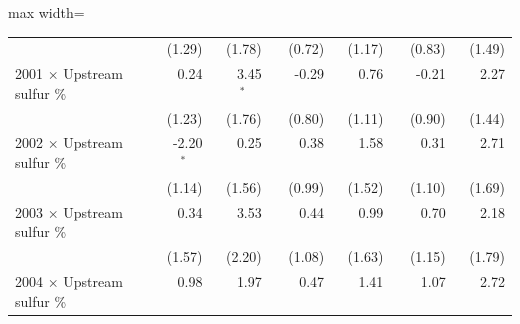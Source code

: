 \begin{table}[htbp]
{\begin{adjustbox}{max width=\linewidth}
\begin{tabular}{lrrrrrr}
 & (\phantom{-}1.29)\phantom{$^{***}$} & (\phantom{-}1.78)\phantom{$^{***}$} & (\phantom{-}0.72)\phantom{$^{***}$} & (\phantom{-}1.17)\phantom{$^{***}$} & (\phantom{-}0.83)\phantom{$^{***}$} & (\phantom{-}1.49)\phantom{$^{***}$} \\
2001 $\times$ Upstream sulfur \% & \phantom{(}\phantom{-}0.24$^{\phantom{*}\phantom{*}\phantom{*}}$ & \phantom{(}\phantom{-}3.45$^{*\phantom{*}\phantom{*}}$ & \phantom{(}-0.29$^{\phantom{*}\phantom{*}\phantom{*}}$ & \phantom{(}\phantom{-}0.76$^{\phantom{*}\phantom{*}\phantom{*}}$ & \phantom{(}-0.21$^{\phantom{*}\phantom{*}\phantom{*}}$ & \phantom{(}\phantom{-}2.27$^{\phantom{*}\phantom{*}\phantom{*}}$ \\
 & (\phantom{-}1.23)\phantom{$^{***}$} & (\phantom{-}1.76)\phantom{$^{***}$} & (\phantom{-}0.80)\phantom{$^{***}$} & (\phantom{-}1.11)\phantom{$^{***}$} & (\phantom{-}0.90)\phantom{$^{***}$} & (\phantom{-}1.44)\phantom{$^{***}$} \\
2002 $\times$ Upstream sulfur \% & \phantom{(}-2.20$^{*\phantom{*}\phantom{*}}$ & \phantom{(}\phantom{-}0.25$^{\phantom{*}\phantom{*}\phantom{*}}$ & \phantom{(}\phantom{-}0.38$^{\phantom{*}\phantom{*}\phantom{*}}$ & \phantom{(}\phantom{-}1.58$^{\phantom{*}\phantom{*}\phantom{*}}$ & \phantom{(}\phantom{-}0.31$^{\phantom{*}\phantom{*}\phantom{*}}$ & \phantom{(}\phantom{-}2.71$^{\phantom{*}\phantom{*}\phantom{*}}$ \\
 & (\phantom{-}1.14)\phantom{$^{***}$} & (\phantom{-}1.56)\phantom{$^{***}$} & (\phantom{-}0.99)\phantom{$^{***}$} & (\phantom{-}1.52)\phantom{$^{***}$} & (\phantom{-}1.10)\phantom{$^{***}$} & (\phantom{-}1.69)\phantom{$^{***}$} \\
2003 $\times$ Upstream sulfur \% & \phantom{(}\phantom{-}0.34$^{\phantom{*}\phantom{*}\phantom{*}}$ & \phantom{(}\phantom{-}3.53$^{\phantom{*}\phantom{*}\phantom{*}}$ & \phantom{(}\phantom{-}0.44$^{\phantom{*}\phantom{*}\phantom{*}}$ & \phantom{(}\phantom{-}0.99$^{\phantom{*}\phantom{*}\phantom{*}}$ & \phantom{(}\phantom{-}0.70$^{\phantom{*}\phantom{*}\phantom{*}}$ & \phantom{(}\phantom{-}2.18$^{\phantom{*}\phantom{*}\phantom{*}}$ \\
 & (\phantom{-}1.57)\phantom{$^{***}$} & (\phantom{-}2.20)\phantom{$^{***}$} & (\phantom{-}1.08)\phantom{$^{***}$} & (\phantom{-}1.63)\phantom{$^{***}$} & (\phantom{-}1.15)\phantom{$^{***}$} & (\phantom{-}1.79)\phantom{$^{***}$} \\
2004 $\times$ Upstream sulfur \% & \phantom{(}\phantom{-}0.98$^{\phantom{*}\phantom{*}\phantom{*}}$ & \phantom{(}\phantom{-}1.97$^{\phantom{*}\phantom{*}\phantom{*}}$ & \phantom{(}\phantom{-}0.47$^{\phantom{*}\phantom{*}\phantom{*}}$ & \phantom{(}\phantom{-}1.41$^{\phantom{*}\phantom{*}\phantom{*}}$ & \phantom{(}\phantom{-}1.07$^{\phantom{*}\phantom{*}\phantom{*}}$ & \phantom{(}\phantom{-}2.72$^{\phantom{*}\phantom{*}\phantom{*}}$ \\

\end{tabular}
\end{adjustbox}}
\end{table}
